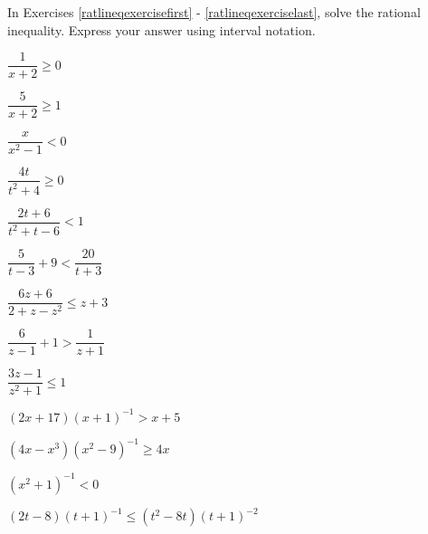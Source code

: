 \documentclass{ximera}
\begin{document}
\begin{question}
In Exercises \ref{ratlineqexercisefirst} - \ref{ratlineqexerciselast}, solve the rational inequality.  Express your answer using interval notation.


\begin{problem}\label{ratlineqexercisefirst}
$\dfrac{1}{x + 2} \geq 0$ 
\end{problem} 

\begin{problem}
$\dfrac{5}{x + 2} \geq 1$
\end{problem} 

\begin{problem}
$\dfrac{x}{x^{2} - 1} <  0$
\end{problem}  

\begin{problem}
$\dfrac{4t}{t^2+4} \geq 0$
\end{problem}    

\begin{problem}
$\dfrac{2t+6}{t^2+t-6} < 1$
\end{problem}

\begin{problem}
$\dfrac{5}{t-3} + 9 < \dfrac{20}{t+3}$
\end{problem}

\begin{problem}
$\dfrac{6z+6}{2+z-z^2} \leq z+3$
\end{problem}  

\begin{problem}
$\dfrac{6}{z-1} + 1 > \dfrac{1}{z+1}$
\end{problem}  

\begin{problem}
$\dfrac{3z - 1}{z^{2} + 1} \leq 1$
\end{problem}

\begin{problem}
$(2x+17)(x+1)^{-1} > x + 5$
\end{problem} 

\begin{problem}
$(4x-x^3)(x^{2} - 9)^{-1} \geq 4x$
\end{problem} 

\begin{problem}
$(x^{2} + 1)^{-1} < 0$
\end{problem}  

\begin{problem}
$(2t-8)(t+1)^{-1} \leq (t^2-8t)(t+1)^{-2}$ %
\end{problem}  


\end{question}
\end{document}
